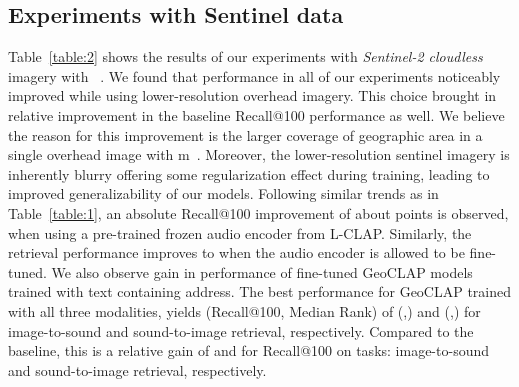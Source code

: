 \documentclass{bmvc2k}
\begin{document}
\subsection{Experiments with Sentinel data}
Table~\ref{table:2} shows the results of our experiments with \textit{Sentinel-2 cloudless} imagery with ~. We found that performance in all of our experiments noticeably improved while using lower-resolution overhead imagery. This choice brought in  relative improvement in the baseline Recall@100 performance as well. We believe the reason for this improvement is the larger coverage of geographic area in a single overhead image with m~. Moreover, the lower-resolution sentinel imagery is inherently blurry offering some regularization effect during training, leading to improved generalizability of our models. Following similar trends as in Table~\ref{table:1}, an absolute Recall@100 improvement of about  points is observed, when using a pre-trained frozen audio encoder from L-CLAP. Similarly, the retrieval performance improves to  when the audio encoder is allowed to be fine-tuned. We also observe gain in performance of fine-tuned GeoCLAP models trained with text containing address. The best performance for GeoCLAP trained with all three modalities, yields (Recall@100, Median Rank) of (,) and (,) for image-to-sound and sound-to-image retrieval, respectively. Compared to the baseline, this is a relative gain of  and  for Recall@100 on tasks: image-to-sound and sound-to-image retrieval, respectively.
\end{document}
